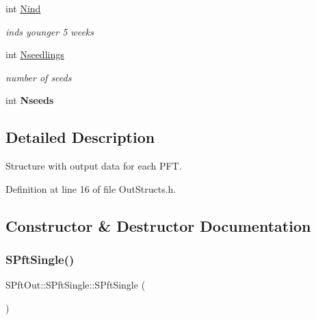 \begin{DoxyCompactItemize}
\mbox{\label{struct_s_pft_out_1_1_s_pft_single_a64b697873379a49d75b53f8f368ee35c}} 
int \mbox{\hyperlink{struct_s_pft_out_1_1_s_pft_single_a64b697873379a49d75b53f8f368ee35c}{Nind}}
\begin{DoxyCompactList}\small\item\em inds younger 5 weeks \end{DoxyCompactList}\item 
\mbox{\label{struct_s_pft_out_1_1_s_pft_single_a5d3419b7a5db3743c084b4130b23adb8}} 
int \mbox{\hyperlink{struct_s_pft_out_1_1_s_pft_single_a5d3419b7a5db3743c084b4130b23adb8}{Nseedlings}}
\begin{DoxyCompactList}\small\item\em number of seeds \end{DoxyCompactList}\item 
\mbox{\label{struct_s_pft_out_1_1_s_pft_single_a64367034bc2009dbc86c91be70994212}} 
int {\bfseries Nseeds}
\end{DoxyCompactItemize}


\subsection{Detailed Description}
Structure with output data for each P\+FT. 

Definition at line 16 of file Out\+Structs.\+h.



\subsection{Constructor \& Destructor Documentation}
\mbox{\label{struct_s_pft_out_1_1_s_pft_single_ada9eb58ae1c564fe1e1aa6c058bffa79}} 
\subsubsection{\texorpdfstring{SPftSingle()}{SPftSingle()}}
{\footnotesize\ttfamily S\+Pft\+Out\+::\+S\+Pft\+Single\+::\+S\+Pft\+Single (\begin{DoxyParamCaption}{ }\end{DoxyParamCaption})}




